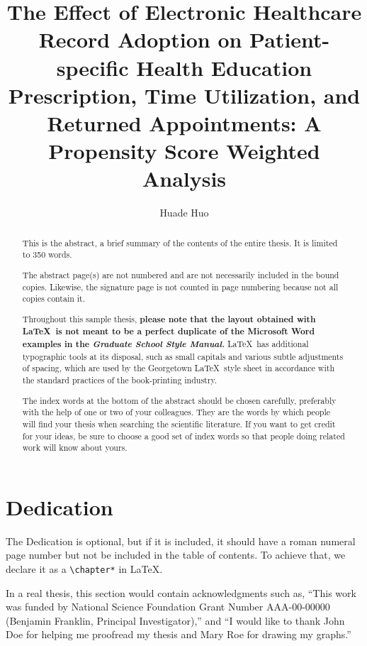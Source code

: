 \documentclass[12pt]{report}
\title{The Effect of Electronic Healthcare Record Adoption
on Patient-specific Health Education Prescription, Time Utilization, and Returned Appointments: A Propensity Score Weighted Analysis}
\author{Huade Huo}
\begin{document}

\maketitle    %

\begin{abstract}
This is the abstract, a brief summary of the contents of the entire thesis.
It is limited to 350 words.

The abstract page(s) are not numbered and are not necessarily included
in the bound copies.  Likewise, the signature page is not counted in
page numbering because not all copies contain it.

Throughout this sample thesis, {\bf please note
that the layout obtained with \LaTeX\ is not meant to be a
perfect duplicate of the Microsoft Word examples in the \emph{Graduate
School Style Manual.}}  \LaTeX\ has additional typographic tools at its
disposal, such as {\sc small capitals} and various subtle adjustments
of spacing, which are used by the Georgetown \LaTeX\ style sheet in
accordance with the standard practices of the book-printing industry.

The index words at the bottom of the abstract should be chosen carefully,
preferably with the help of one or two of your colleagues.
They are the words by which people will find your thesis when searching
the scientific literature.
If you want to get credit for your ideas, be sure to choose a good set of
index words so that people doing related work will know about yours.
\end{abstract}


\chapter*{Dedication}
The Dedication is optional, but if it is included, it should have
a roman numeral page number but not be included in the table of
contents.  To achieve that, we declare it as a \verb"\chapter*" in \LaTeX.



In a real thesis, this section would contain acknowledgments such
as, ``This work was funded by National Science Foundation Grant
Number AAA-00-00000 (Benjamin Franklin, Principal Investigator),''
and ``I would like to thank John Doe for helping me proofread my
thesis and Mary Roe for drawing my graphs.''
\end{document}
